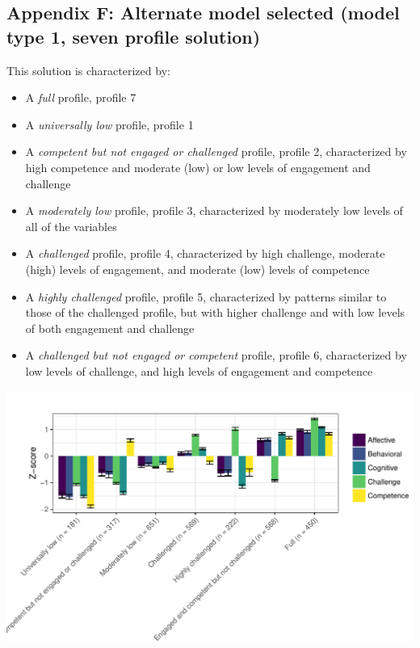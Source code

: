\documentclass[]{book}
\providecommand{\tightlist}{%
  \setlength{\itemsep}{0pt}\setlength{\parskip}{0pt}}
\theoremstyle{definition}
\theoremstyle{definition}
\theoremstyle{definition}
\theoremstyle{remark}
\begin{document}
\subsection{Appendix F: Alternate model selected (model type 1, seven
profile
solution)}\label{appendix-f-alternate-model-selected-model-type-1-seven-profile-solution}

This solution is characterized by:

\begin{itemize}
\tightlist
\item
  A \emph{full} profile, profile 7
\item
  A \emph{universally low} profile, profile 1
\item
  A \emph{competent but not engaged or challenged} profile, profile 2,
  characterized by high competence and moderate (low) or low levels of
  engagement and challenge
\item
  A \emph{moderately low} profile, profile 3, characterized by
  moderately low levels of all of the variables
\item
  A \emph{challenged} profile, profile 4, characterized by high
  challenge, moderate (high) levels of engagement, and moderate (low)
  levels of competence
\item
  A \emph{highly challenged} profile, profile 5, characterized by
  patterns similar to those of the challenged profile, but with higher
  challenge and with low levels of both engagement and challenge
\item
  A \emph{challenged but not engaged or competent} profile, profile 6,
  characterized by low levels of challenge, and high levels of
  engagement and competence
\end{itemize}

\begin{center}\includegraphics[width=0.9\linewidth]{rosenberg-dissertation_files/figure-latex/m1_7p-1} \end{center}
\end{document}
